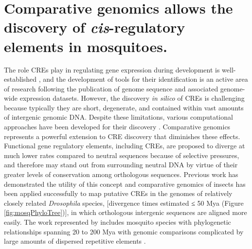 \section{Comparative genomics allows the discovery of \textit{cis}-regulatory elements in mosquitoes. \cite{Sieglaff2009}}






The role \glspl{CRE} play in regulating gene expression during development is well-established \cite{Davidson2010}, and the development of tools for their identification is an active area of research following the publication of genome sequence and associated genome-wide expression datasets. However, the discovery \textit{in silico} of \glspl{CRE} is challenging because typically they are short, degenerate, and contained within vast amounts of intergenic genomic DNA. Despite these limitations, various computational approaches have been developed for their discovery \cite{Das2007a,Hu2005,Tompa2005,Wasserman2004}. Comparative genomics represents a powerful extension to \gls{CRE} discovery that diminishes these effects. Functional gene regulatory elements, including \glspl{CRE}, are proposed to diverge at much lower rates compared to neutral sequences because of selective pressures, and therefore may stand out from surrounding neutral DNA by virtue of their greater levels of conservation among orthologous sequences. Previous work has demonstrated the utility of this concept \cite{Elemento2005,Stark2007,Xie2005} and comparative genomics of insects has been applied successfully to map putative \glspl{CRE} in the genomes of relatively closely related \textit{Drosophila} species, [divergence times estimated ≤ 50 \gls{Mya} \cite{Stark2007} (Figure \ref{fig:mosqPhyloTree})], in which orthologous intergenic sequences are aligned more easily. The work represented by \citet{Sieglaff2009} includes mosquito species with phylogenetic relationships spanning 20 to 200 \gls{Mya} with genomic comparisons complicated by large amounts of dispersed repetitive elements \cite{Nene2007}.

